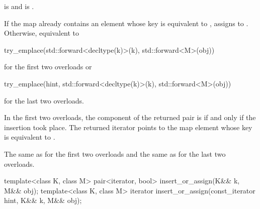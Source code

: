 \begin{itemdescr}
\pnum
\constraints
{} is  and
 is .

\pnum
\effects
If the map already contains an element 
whose key is equivalent to ,
assigns  to .
Otherwise, equivalent to
\begin{codeblock}
try_emplace(std::forward<decltype(k)>(k), std::forward<M>(obj))
\end{codeblock}
for the first two overloads or
\begin{codeblock}
try_emplace(hint, std::forward<decltype(k)>(k), std::forward<M>(obj))
\end{codeblock}
for the last two overloads.

\pnum
\returns
In the first two overloads, the  component of the returned pair
is  if and only if the insertion took place.  The returned
iterator points to the map element whose key is equivalent to .

\pnum
\complexity
The same as  for the first two overloads and
the same as  for the last two overloads.
\end{itemdescr}

%
\begin{itemdecl}
template<class K, class M>
  pair<iterator, bool> insert_or_assign(K&& k, M&& obj);
template<class K, class M>
  iterator insert_or_assign(const_iterator hint, K&& k, M&& obj);
\end{itemdecl}

